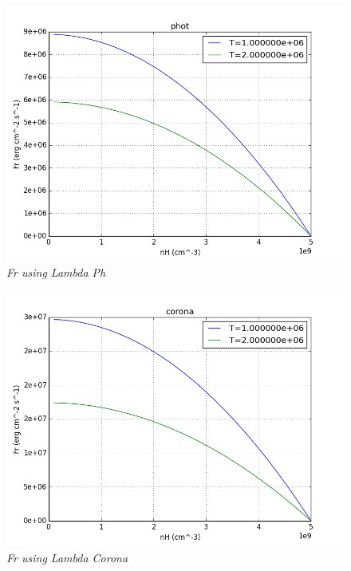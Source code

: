 \documentclass[10pt]{book}
\begin{document}
\begin{figure}[H]
 \centering
 \includegraphics[scale=0.6]{Frphot.png}
 \caption{\emph{Fr using Lambda Ph}}
\end{figure}

\begin{figure}[H]
 \centering
 \includegraphics[scale=0.6]{Frcorona.png}
 \caption{\emph{Fr using Lambda Corona}}
\end{figure}
\end{document}
